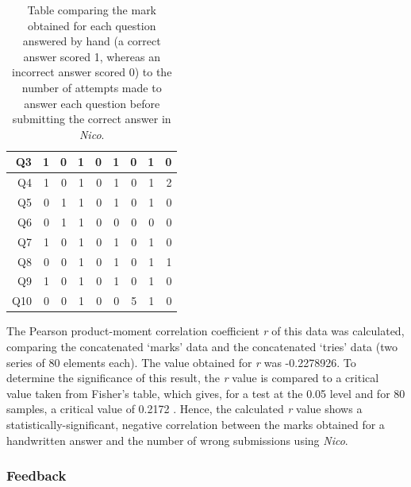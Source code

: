 \documentclass[12pt,twoside,notitlepage,xetex]{report}
\begin{document}
{\begin{center}
\begin{table}[H]
\begin{center}
\begin{tabular}{|r||r|r||r|r||r|r||r|r|}
Q3 & 1 & 0 & 1 & 0 & 1 & 0 & 1 & 0\\ \hline
Q4 & 1 & 0 & 1 & 0 & 1 & 0 & 1 & 2\\ \hline
Q5 & 0 & 1 & 1 & 0 & 1 & 0 & 1 & 0\\ \hline
Q6 & 0 & 1 & 1 & 0 & 0 & 0 & 0 & 0\\ \hline
Q7 & 1 & 0 & 1 & 0 & 1 & 0 & 1 & 0\\ \hline
Q8 & 0 & 0 & 1 & 0 & 1 & 0 & 1 & 1\\ \hline
Q9 & 1 & 0 & 1 & 0 & 1 & 0 & 1 & 0\\ \hline
Q10 & 0 & 0 & 1 & 0 & 0 & 5 & 1 & 0\\
\hline
\end{tabular}
\end{center}
\caption{Table comparing the mark obtained for each question answered by hand (a correct answer scored 1, whereas an incorrect answer scored 0) to the number of attempts made to answer each question before submitting the correct answer in \emph{Nico}.}
\label{tab:MarksTries}
\end{table}
\end{center}

The Pearson product-moment correlation coefficient \emph{r} of this data was calculated, comparing the concatenated `marks' data and the concatenated `tries' data (two series of 80 elements each).  The value obtained for \emph{r} was -0.2278926.  To determine the significance of this result, the \emph{r} value is compared to a critical value taken from Fisher's table, which gives, for a test at the 0.05 level and for 80 samples, a critical value of 0.2172 \cite{Fisher1990}.  Hence, the calculated \emph{r} value shows a statistically-significant, negative correlation between the marks obtained for a handwritten answer and the number of wrong submissions using \emph{Nico}.

\subsubsection{Feedback}

}
\end{document}
